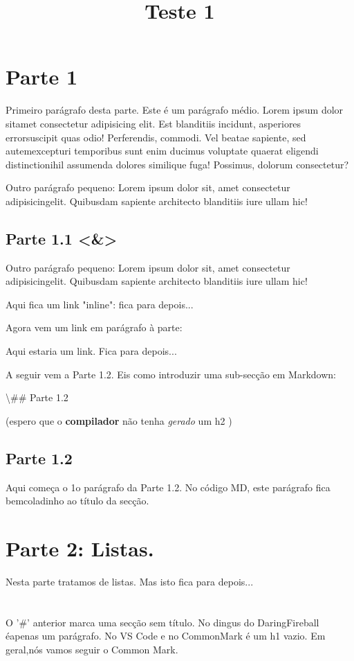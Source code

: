 \documentclass{article}
\title{Teste 1}
\date{}
\begin{document}
\maketitle
\section*{Parte 1}
Primeiro parágrafo desta parte. Este é um parágrafo médio. Lorem ipsum dolor sitamet consectetur adipisicing elit. Est blanditiis incidunt, asperiores errorsuscipit quas odio! Perferendis, commodi. Vel beatae sapiente, sed autemexcepturi temporibus sunt enim ducimus voluptate quaerat eligendi distinctionihil assumenda dolores similique fuga! Possimus, dolorum consectetur?

Outro parágrafo pequeno: Lorem ipsum dolor sit, amet consectetur adipisicingelit. Quibusdam sapiente architecto blanditiis iure ullam hic!

\subsection*{Parte 1.1 <\&>}
Outro parágrafo pequeno: Lorem ipsum dolor sit, amet consectetur adipisicingelit. Quibusdam sapiente architecto blanditiis iure ullam hic!

Aqui fica um link "inline": fica para depois...

Agora vem um link em parágrafo à parte:

Aqui estaria um link. Fica para depois...

A seguir vem a Parte 1.2. Eis como introduzir uma sub-secção em Markdown:

\textbackslash{}\#\# Parte 1.2

(espero que o \textbf{compilador} não tenha \textit{gerado} um h2 )

\subsection*{Parte 1.2}
Aqui começa o 1o parágrafo da Parte 1.2. No código MD, este parágrafo fica bemcoladinho ao título da secção.

\section*{Parte 2: Listas.}
Nesta parte tratamos de listas. Mas isto fica para depois...

\section*{}
O '\#' anterior marca uma secção sem título. No dingus do DaringFireball éapenas um parágrafo. No VS Code e no CommonMark é um h1 vazio. Em geral,nós vamos seguir o Common Mark.
\end{document}
